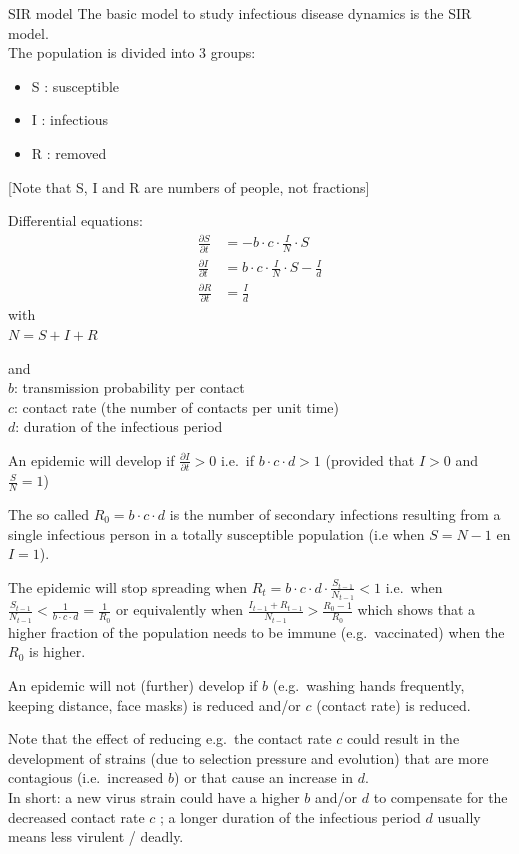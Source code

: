 \documentclass[
  ignorenonframetext,
]{beamer}
\providecommand{\tightlist}{%
  \setlength{\itemsep}{0pt}\setlength{\parskip}{0pt}}
\begin{document}
\begin{frame}{SIR model}
\protect\hypertarget{sir-model}{}
The basic model to study infectious disease dynamics is the SIR model.\\
The population is divided into 3 groups:

\begin{itemize}
\tightlist
\item
  S : susceptible
\item
  I : infectious\\
\item
  R : removed
\end{itemize}

{[}Note that S, I and R are numbers of people, not fractions{]}

Differential equations: \[
\begin{align}
\frac{\partial S}{\partial t} &= −b\cdot c\cdot \frac{I}{N} \cdot S \\
\frac{\partial I}{\partial t} &= b\cdot c\cdot \frac{I}{N} \cdot S - \frac{I}{d} \\
\frac{\partial R}{\partial t} &= \frac{I}{d}
\end{align}
\] with\\
\(N=S+I+R\)

and\\
\(b\): transmission probability per contact\\
\(c\): contact rate (the number of contacts per unit time)\\
\(d\): duration of the infectious period

An epidemic will develop if \(\frac{\partial I}{\partial t} > 0\)
i.e.~if \(b \cdot c \cdot d >1\) (provided that \(I>0\) and
\(\frac{S}{N} = 1\))

The so called \(R_0 = b \cdot c \cdot d\) is the number of secondary
infections resulting from a single infectious person in a totally
susceptible population (i.e when \(S = N−1\) en \(I = 1\)).

The epidemic will stop spreading when
\(R_t = b \cdot c \cdot d \cdot \frac{S_{t-1}}{N_{t-1}} < 1\) i.e.~when
\(\frac{S_{t-1}}{N_{t-1}} < \frac{1}{b \cdot c \cdot d} = \frac{1}{R_0}\)
or equivalently when
\(\frac{I_{t-1}+R_{t-1}}{N_{t-1}} > \frac{R_0-1}{R_0}\) which shows that
a higher fraction of the population needs to be immune (e.g.~vaccinated)
when the \(R_0\) is higher.

An epidemic will not (further) develop if \(b\) (e.g.~washing hands
frequently, keeping distance, face masks) is reduced and/or \(c\)
(contact rate) is reduced.

Note that the effect of reducing e.g.~the contact rate \(c\) could
result in the development of strains (due to selection pressure and
evolution) that are more contagious (i.e.~increased \(b\)) or that cause
an increase in \(d\).\\
In short: a new virus strain could have a higher \(b\) and/or \(d\) to
compensate for the decreased contact rate \(c\) ; a longer duration of
the infectious period \(d\) usually means less virulent / deadly.
\end{frame}
\end{document}

